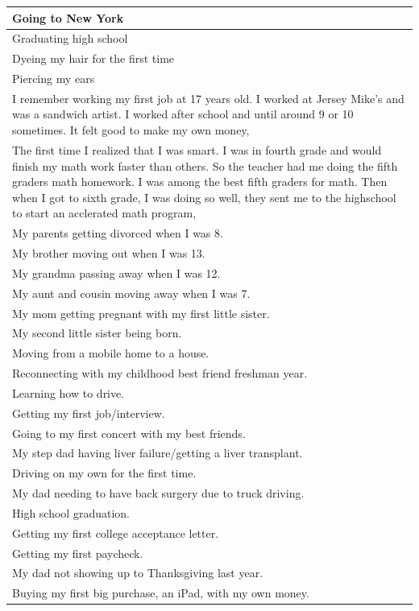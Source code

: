 \documentclass[
  .7em,
  letterpaper,
  DIV=11,
  numbers=noendperiod]{scrartcl}
\begin{document}
\begin{table}
\begin{tabular}{l}
\hline
Going to New York\\
\hline
Graduating high school\\
\hline
Dyeing my hair for the first time\\
\hline
Piercing my ears\\
\hline
I remember working my first job at 17 years old. I worked at Jersey Mike's and was a sandwich artist. I worked after school and until around 9 or 10 sometimes. It felt good to make my own money,\\
\hline
The first time I realized that I was smart. I was in fourth grade and would finish my math work faster than others. So the teacher had me doing the fifth graders math homework. I was among the best fifth graders for math. Then when I got to sixth grade, I was doing so well, they sent me to the highschool to start an acclerated math program,\\
\hline
My parents getting divorced when I was 8.\\
\hline
My brother moving out when I was 13.\\
\hline
My grandma passing away when I was 12.\\
\hline
My aunt and cousin moving away when I was 7.\\
\hline
My mom getting pregnant with my first little sister.\\
\hline
My second little sister being born.\\
\hline
Moving from a mobile home to a house.\\
\hline
Reconnecting with my childhood best friend freshman year.\\
\hline
Learning how to drive.\\
\hline
Getting my first job/interview.\\
\hline
Going to my first concert with my best friends.\\
\hline
My step dad having liver failure/getting a liver transplant.\\
\hline
Driving on my own for the first time.\\
\hline
My dad needing to have back surgery due to truck driving.\\
\hline
High school graduation.\\
\hline
Getting my first college acceptance letter.\\
\hline
Getting my first paycheck.\\
\hline
My dad not showing up to Thanksgiving last year.\\
\hline
Buying my first big purchase, an iPad, with my own money.\\

\end{tabular}
\end{table}
\end{document}
